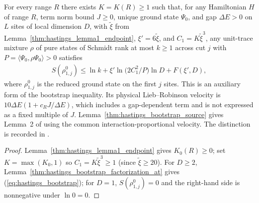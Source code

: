\begin{lemma}
    \label{thm:hastings_bootstrap}
    \leanok
    For every range $R$ there exists $K=K(R)\ge1$ such that, for any Hamiltonian
    $H$ of range $R$, term norm bound $J\ge0$, unique ground state $\Psi_0$, and
    gap $\Delta E>0$ on $L$ sites of local dimension $D$, with $\tilde\xi$ from
    Lemma~\ref{thm:hastings_lemma1_endpoint}, $\xi'=6\tilde\xi$, and
    $C_1=K\tilde\xi^3$, any unit-trace mixture $\rho$ of pure states of Schmidt
    rank at most $k\ge1$ across cut $j$ with
    $P=\langle\Psi_0,\rho\Psi_0\rangle>0$ satisfies
    \begin{align}
        S(\rho^0_{1,j})\le\ln k+\xi'\ln\bigl(2C_1^2/P\bigr)\ln D+F(\xi',D),
        \label{eq:hastings_bootstrap}
    \end{align}
    where $\rho^0_{1,j}$ is the reduced ground state on the first $j$ sites.
    This is an auxiliary form of the bootstrap inequality. Its physical
    Lieb--Robinson velocity is $10\Delta E(1+c_RJ/\Delta E)$, which includes
    a gap-dependent term and is not expressed as a fixed multiple of $J$.
    Lemma~\ref{thm:hastings_bootstrap_source} gives Lemma~2 of
    \cite[lines 280--311]{Hastings2007AreaLaw} using the common
    interaction-proportional velocity. The distinction is recorded in
    \cite{gap:hastings07_lemma1_decay_length}.
\end{lemma}
\begin{proof}\leanok
    Lemma~\ref{thm:hastings_lemma1_endpoint} gives $K_0(R)\ge0$; set
    $K=\max(K_0,1)$ so $C_1=K\tilde\xi^3\ge1$ (since $\tilde\xi\ge20$). For
    $D\ge2$, Lemma~\ref{thm:hastings_bootstrap_factorization_at} gives
    (\ref{eq:hastings_bootstrap}); for $D=1$, $S(\rho^0_{1,j})=0$ and the
    right-hand side is nonnegative under $\ln0=0$.
\end{proof}



